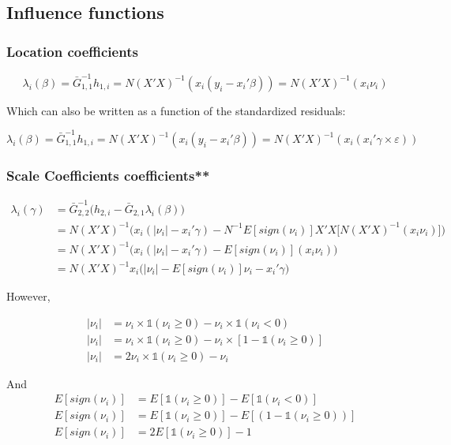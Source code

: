 \documentclass[
  authoryear,
  preprint,
  1p]{elsarticle}
\begin{document}
\hypertarget{influence-functions}{%
\subsection{Influence functions}\label{influence-functions}}

\hypertarget{location-coefficients}{%
\subsubsection{Location coefficients}\label{location-coefficients}}

\[\lambda_i(\beta) = \bar G^{-1}_{1,1} h_{1,i} = N (X'X)^{-1}(x_i (y_i-x_i'\beta)) = N (X'X)^{-1}(x_i \nu_i)
\]

Which can also be written as a function of the standardized residuals:

\[\lambda_i(\beta) = \bar G^{-1}_{1,1} h_{1,i} = N (X'X)^{-1}(x_i (y_i-x_i'\beta)) = N (X'X)^{-1}(x_i ( x_i'\gamma \times \varepsilon))
\]

\hypertarget{scale-coefficients-coefficients}{%
\subsubsection{Scale Coefficients
coefficients**}\label{scale-coefficients-coefficients}}

\[\begin{aligned}
\lambda_i(\gamma)&=\bar G_{2,2}^{-1}\Big(h_{2,i}-\bar G_{2,1} \lambda_i(\beta)\Big) \\
&=N (X'X)^{-1} \Big(x_i(|\nu_i|-x_i' \gamma) 
- N^{-1} E[sign(\nu_i)] X'X \big[ N (X'X)^{-1}(x_i \nu_i) \big] \Big) \\
&=N (X'X)^{-1} \Big(x_i(|\nu_i|-x_i' \gamma) - E[sign(\nu_i)] (x_i \nu_i)  \Big) \\
&=N (X'X)^{-1} x_i \Big( |\nu_i| - E[sign(\nu_i)] \nu_i -x_i' \gamma \Big) 
\end{aligned}
\]

However,

\[\begin{aligned}
|\nu_i| &= \nu_i \times \mathbb{1}(\nu_i \geq 0) - \nu_i \times \mathbb{1}(\nu_i < 0) \\
|\nu_i| &= \nu_i \times \mathbb{1}(\nu_i \geq 0) - \nu_i \times [1-\mathbb{1}(\nu_i \geq 0)] \\
|\nu_i| &= 2 \nu_i \times \mathbb{1}(\nu_i \geq 0) - \nu_i  
\end{aligned}
\]

And \[\begin{aligned}
E[sign(\nu_i)] &= E[\mathbb{1}(\nu_i \geq 0)] - E[\mathbb{1}(\nu_i < 0)] \\
E[sign(\nu_i)] &= E[\mathbb{1}(\nu_i \geq 0)] - E[(1-\mathbb{1}(\nu_i \geq 0))] \\
E[sign(\nu_i)] &= 2 E[\mathbb{1}(\nu_i \geq 0)] - 1
\end{aligned}
\]
\end{document}
